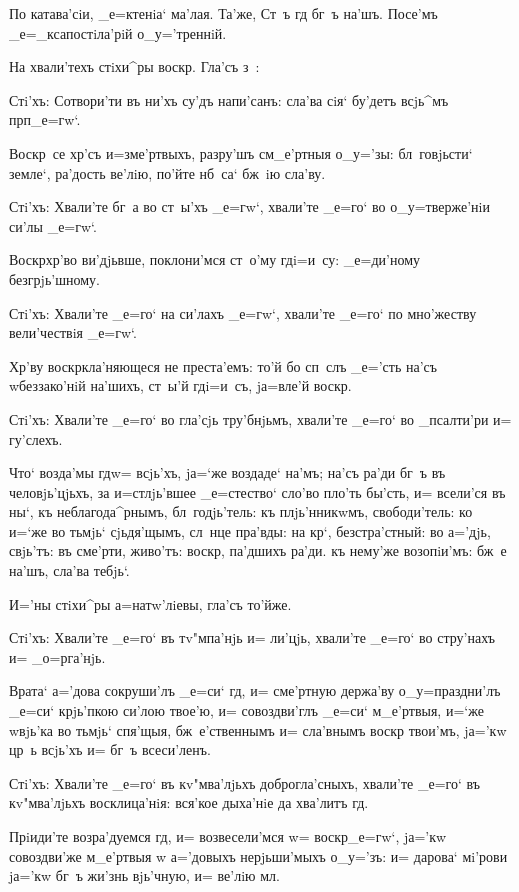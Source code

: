По катава'сiи, _е=ктенiа` ма'лая. Та'же, Ст~ъ гд 
бг~ъ на'шъ. Посе'мъ _е=_ксапостiла'рiй о_у='треннiй.

На хвали'техъ стiхи^ры воскр. Гла'съ з~:

Стi'хъ: Сотвори'ти въ ни'хъ су'дъ напи'санъ: сла'ва 
сiя` бу'детъ всjь^мъ прп _е=гw`.

Воскр~се хр'съ и=з\ъ ме'ртвыхъ, разру'шъ 
см_е'ртныя о_у='зы: бл~говjьсти` земле`, ра'дость ве'лiю, 
по'йте нб~са` бж~iю сла'ву.

Стi'хъ: Хвали'те бг~а во ст~ы'хъ _е=гw`, хвали'те 
_е=го` во о_у=тверже'нiи си'лы _е=гw`.

Воскр хр'во ви'дjьвше, поклони'мся ст~о'му 
гд i=и~су: _е=ди'ному безгрjь'шному.

Стi'хъ: Хвали'те _е=го` на си'лахъ _е=гw`, хвали'те 
_е=го` по мно'жеству вели'чествiя _е=гw`.

Хр'ву воскр кла'няющеся не преста'емъ: то'й 
бо сп~слъ _е='сть на'съ w\т беззако'нiй на'шихъ, ст~ы'й 
гд i=и~съ, jа=вле'й воскр.

Стi'хъ: Хвали'те _е=го` во гла'сjь тру'бнjьмъ, 
хвали'те _е=го` во _псалти'ри и= гу'слехъ.

Что` возда'мы гд w= всjь'хъ, jа=`же воздаде` 
на'мъ; на'съ ра'ди бг~ъ въ человjь'цjьхъ, за и=стлjь'вшее 
_е=стество` сло'во пло'ть бы'сть, и= всели'ся въ ны`, къ 
неблагода^рнымъ, бл~годjь'тель: къ плjь'нникwмъ, 
свободи'тель: ко и=`же во тьмjь` сjьдя'щымъ, сл~нце 
пра'вды: на кр`, безстра'стный: во а='дjь, свjь'тъ: 
въ сме'рти, живо'тъ: воскр, па'дшихъ ра'ди. къ 
нему'же возопiи'мъ: бж~е на'шъ, сла'ва тебjь`.

И='ны стiхи^ры а=натw'лiевы, гла'съ то'йже.

Стi'хъ: Хвали'те _е=го` въ тv"мпа'нjь и= ли'цjь, 
хвали'те _е=го` во стру'нахъ и= _о=рга'нjь.

Врата` а='дова сокруши'лъ _е=си` гд, и= сме'ртную 
держа'ву о_у=праздни'лъ _е=си` крjь'пкою си'лою твое'ю, 
и= совоздви'глъ _е=си` м_е'ртвыя, и=`же w\т вjь'ка во 
тьмjь` спя'щыя, бж~е'ственнымъ и= сла'внымъ воскр 
твои'мъ, jа='кw цр~ь всjь'хъ и= бг~ъ всеси'ленъ.

Стi'хъ: Хвали'те _е=го` въ кv"мва'лjьхъ 
доброгла'сныхъ, хвали'те _е=го` въ кv"мва'лjьхъ 
восклица'нiя: вся'кое дыха'нiе да хва'литъ гд.

Прiиди'те возра'дуемся гд, и= возвесели'мся w= 
воскр _е=гw`, jа='кw совоздви'же м_е'ртвыя w\т 
а='довыхъ нерjьши'мыхъ о_у='зъ: и= дарова` мi'рови jа='кw 
бг~ъ жи'знь вjь'чную, и= ве'лiю мл.

